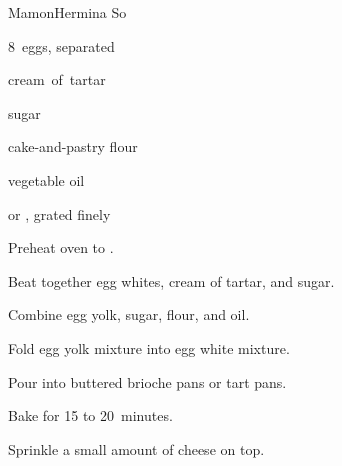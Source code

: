 \begin{recipe}{Mamon}{Hermina So}{}

\begin{ingredients}
\item 8~eggs, separated
\item \tp{\half} cream~of~tartar
\item \C{1\twothird} sugar
\item {} cake-and-pastry flour
\item \C{\half} vegetable oil
\item {} or , grated finely
\end{ingredients}

\begin{directions}
\item Preheat oven to .
\item Beat together egg whites, cream of tartar, and \C{\twothird} sugar.
\item Combine egg yolk,  sugar, flour, and oil.
\item Fold egg yolk mixture into egg white mixture.
\item Pour into buttered brioche pans or tart pans.
\item Bake for 15 to 20~minutes.
\item Sprinkle a small amount of cheese on top.
\end{directions}

\end{recipe}
